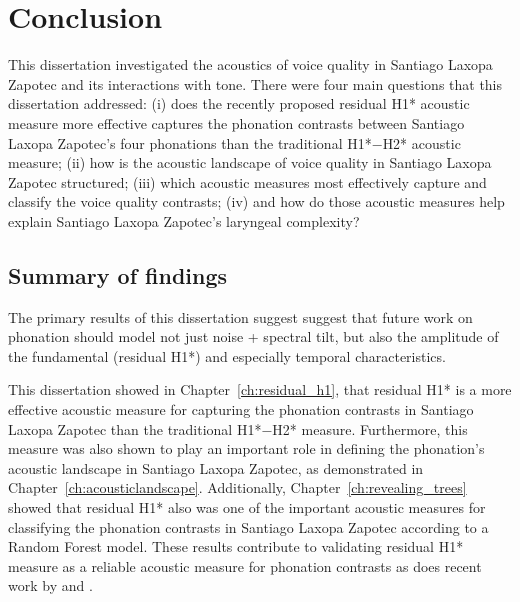 \chapter{Conclusion} \label{ch:conclusion}


This dissertation investigated the acoustics of voice quality in Santiago Laxopa Zapotec and its interactions with tone. There were four main questions that this dissertation addressed: (i) does the recently proposed residual H1* acoustic measure more effective captures the phonation contrasts between Santiago Laxopa Zapotec's four phonations than the traditional H1*$-$H2* acoustic measure; (ii) how is the acoustic landscape of voice quality in Santiago Laxopa Zapotec structured; (iii) which acoustic measures most effectively capture and classify the voice quality contrasts; (iv) and how do those acoustic measures help explain Santiago Laxopa Zapotec's laryngeal complexity? 

\section{Summary of findings}\label{sec:summary_of_findings}
The primary results of this dissertation suggest suggest that future work on phonation should model not just noise + spectral tilt, but also the amplitude of the fundamental (residual H1*) and especially temporal characteristics. 

This dissertation showed in Chapter~\ref{ch:residual_h1}, that  residual H1* is a more effective acoustic measure for capturing the phonation contrasts in Santiago Laxopa Zapotec than the traditional H1*$-$H2* measure. Furthermore, this measure was also shown to play an important role in defining the phonation's acoustic landscape in Santiago Laxopa Zapotec, as demonstrated in Chapter~\ref{ch:acousticlandscape}. Additionally, Chapter~\ref{ch:revealing_trees} showed that residual H1* also was one of the important acoustic measures for classifying the phonation contrasts in Santiago Laxopa Zapotec according to a Random Forest model. These results contribute to validating  residual H1* measure as a reliable acoustic measure for phonation contrasts as does recent work by \citet{chaiPhoneticsGlottalizedPhonations2023} and \citet{garellekMarginsPhonologyPhonetics2025}. 

